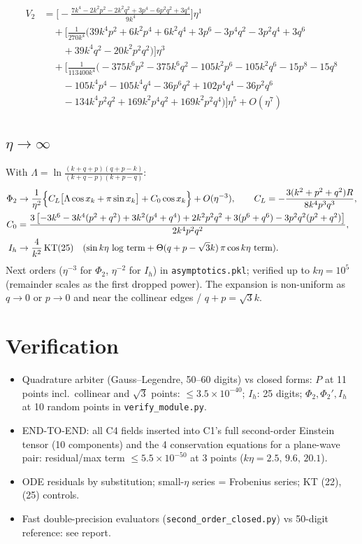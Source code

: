 \documentclass[10pt]{article}
\begin{document}
\begin{align}
V_2&=\Big[- \frac{7 k^{4} - 2 k^{2} p^{2} - 2 k^{2} q^{2} + 3 p^{4} - 6 p^{2} q^{2} + 3 q^{4}}{9 k^{4}}\Big]\eta^{1} \\ &\quad + \Big[\frac{1}{270 k^{4}}\Big(39 k^{4} p^{2} + 6 k^{2} p^{4} + 6 k^{2} q^{4} + 3 p^{6} - 3 p^{4} q^{2} - 3 p^{2} q^{4} + 3 q^{6} \\ &\qquad +39 k^{4} q^{2} - 20 k^{2} p^{2} q^{2}\Big)\Big]\eta^{3} \\ &\quad + \Big[\frac{1}{113400 k^{4}}\Big(- 375 k^{6} p^{2} - 375 k^{6} q^{2} - 105 k^{2} p^{6} - 105 k^{2} q^{6} - 15 p^{8} - 15 q^{8} \\ &\qquad - 105 k^{4} p^{4} - 105 k^{4} q^{4} - 36 p^{6} q^{2} + 102 p^{4} q^{4} - 36 p^{2} q^{6} \\ &\qquad - 134 k^{4} p^{2} q^{2} + 169 k^{2} p^{4} q^{2} + 169 k^{2} p^{2} q^{4}\Big)\Big]\eta^{5} + O(\eta^{7})
\end{align}
\subsection*{$\eta\to\infty$}
With $\Lambda=\ln\frac{(k+q+p)(q+p-k)}{(k+q-p)(k+p-q)}$:
\begin{align}
\Phi_2&\to\frac{1}{\eta^2}\Big\{C_L\big[\Lambda\cos x_k+\pi\sin x_k\big]+C_0\cos x_k\Big\}+O(\eta^{-3}),\qquad C_L=-\frac{3(k^2+p^2+q^2)R}{8k^4p^3q^3},\\
C_0&=\frac{3\left[-3k^6-3k^4(p^2+q^2)+3k^2(p^4+q^4)+2k^2p^2q^2+3(p^6+q^6)-3p^2q^2(p^2+q^2)\right]}{2k^4p^2q^2},\\
I_h&\to\frac{4}{k^2}\,{\rm KT}(25)\quad(\sin k\eta\ \text{log term}+\Theta(q+p-\sqrt3k)\,\pi\cos k\eta\ \text{term}).
\end{align}
Next orders ($\eta^{-3}$ for $\Phi_2$, $\eta^{-2}$ for $I_h$) in \texttt{asymptotics.pkl}; verified up to $k\eta=10^5$ (remainder
scales as the first dropped power). The expansion is non-uniform as $q\to0$ or $p\to0$ and near the collinear edges / $q+p=\sqrt3k$.

\section{Verification}
\begin{itemize}
\item Quadrature arbiter (Gauss--Legendre, 50--60 digits) vs closed forms: $P$ at 11 points incl.\ collinear and $\sqrt3$ points:
$\le3.5\times10^{-40}$; $I_h$: 25 digits; $\Phi_2,\Phi_2',I_h$ at 10 random points in \texttt{verify\_module.py}.
\item END-TO-END: all C4 fields inserted into C1's full second-order Einstein tensor (10 components) and the 4 conservation
equations for a plane-wave pair: residual/max term $\le5.5\times10^{-50}$ at 3 points ($k\eta=2.5,\,9.6,\,20.1$).
\item ODE residuals by substitution; small-$\eta$ series = Frobenius series; KT (22),(25) controls.
\item Fast double-precision evaluators (\texttt{second\_order\_closed.py}) vs 50-digit reference: see report.
\end{itemize}
\appendix
\end{document}
